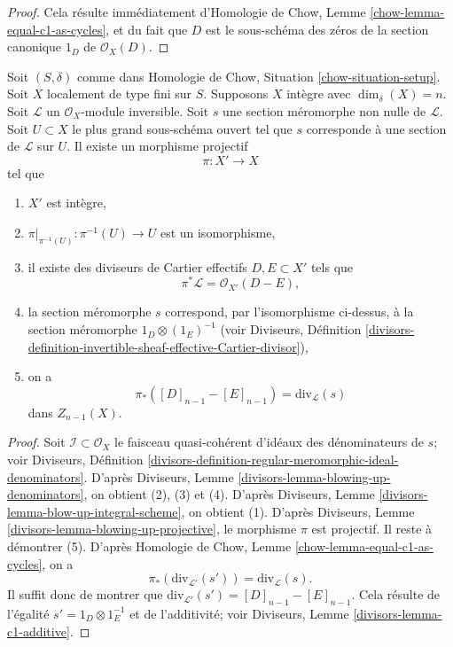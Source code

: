 \begin{proof}
Cela résulte immédiatement d'Homologie de Chow, Lemme \ref{chow-lemma-equal-c1-as-cycles},
et du fait que $D$ est le sous-schéma des zéros
de la section canonique $1_D$ de $\mathcal{O}_X(D)$.
\end{proof}

\begin{lemma}
\label{lemma-blowing-up-denominators}
Soit $(S, \delta)$ comme dans Homologie de Chow, Situation \ref{chow-situation-setup}.
Soit $X$ localement de type fini sur $S$.
Supposons $X$ intègre avec $\dim_\delta(X) = n$.
Soit $\mathcal{L}$ un $\mathcal{O}_X$-module inversible.
Soit $s$ une section méromorphe non nulle de $\mathcal{L}$.
Soit $U \subset X$ le plus grand sous-schéma ouvert tel que
$s$ corresponde à une section de $\mathcal{L}$ sur $U$.
Il existe un morphisme projectif
$$
\pi : X' \longrightarrow X
$$
tel que
\begin{enumerate}
\item $X'$ est intègre,
\item $\pi|_{\pi^{-1}(U)} : \pi^{-1}(U) \to U$ est un isomorphisme,
\item il existe des diviseurs de Cartier effectifs $D, E \subset X'$
tels que
$$
\pi^*\mathcal{L} = \mathcal{O}_{X'}(D - E),
$$
\item la section méromorphe $s$ correspond, par l'isomorphisme ci-dessus,
à la section méromorphe $1_D \otimes (1_E)^{-1}$ (voir
Diviseurs, Définition
\ref{divisors-definition-invertible-sheaf-effective-Cartier-divisor}),
\item on a
$$
\pi_*([D]_{n - 1} - [E]_{n - 1}) = \text{div}_\mathcal{L}(s)
$$
dans $Z_{n - 1}(X)$.
\end{enumerate}
\end{lemma}

\begin{proof}
Soit $\mathcal{I} \subset \mathcal{O}_X$ le faisceau quasi-cohérent d'idéaux
des dénominateurs de $s$; voir Diviseurs, Définition
\ref{divisors-definition-regular-meromorphic-ideal-denominators}.
D'après Diviseurs, Lemme \ref{divisors-lemma-blowing-up-denominators},
on obtient (2), (3) et (4).
D'après Diviseurs, Lemme \ref{divisors-lemma-blow-up-integral-scheme},
on obtient (1). D'après Diviseurs, Lemme \ref{divisors-lemma-blowing-up-projective},
le morphisme $\pi$ est projectif.
Il reste à démontrer (5).
D'après Homologie de Chow, Lemme \ref{chow-lemma-equal-c1-as-cycles}, on a
$$
\pi_*(\text{div}_{\mathcal{L}'}(s')) = \text{div}_\mathcal{L}(s).
$$
Il suffit donc de montrer que
$\text{div}_{\mathcal{L}'}(s') = [D]_{n - 1} - [E]_{n - 1}$.
Cela résulte de l'égalité
$s' = 1_D \otimes 1_E^{-1}$ et de l'additivité; voir
Diviseurs, Lemme \ref{divisors-lemma-c1-additive}.
\end{proof}

